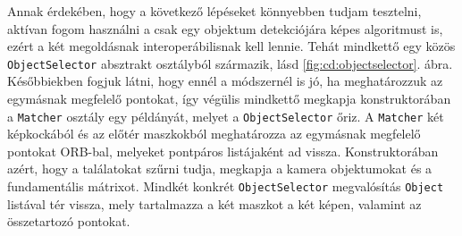 Annak érdekében, hogy a következő lépéseket könnyebben tudjam tesztelni, aktívan fogom használni a csak egy objektum detekciójára képes algoritmust is, ezért a két megoldásnak interoperábilisnak kell lennie. Tehát mindkettő egy közös \texttt{ObjectSelector} absztrakt osztályból származik, lásd \ref{fig:cd:objectselector}. ábra. Későbbiekben fogjuk látni, hogy ennél a módszernél is jó, ha meghatározzuk az egymásnak megfelelő pontokat, így végülis mindkettő megkapja konstruktorában a \texttt{Matcher} osztály egy példányát, melyet a \texttt{ObjectSelector} őriz. A \texttt{Matcher} két képkockából és az előtér maszkokból meghatározza az egymásnak megfelelő pontokat ORB-bal, melyeket pontpáros listájaként ad vissza. Konstruktorában azért, hogy a találatokat szűrni tudja, megkapja a kamera objektumokat és a fundamentális mátrixot. Mindkét konkrét \texttt{ObjectSelector} megvalósítás \texttt{Object} listával tér vissza, mely tartalmazza a két maszkot a két képen, valamint az összetartozó pontokat.


